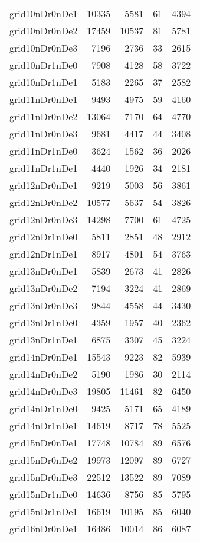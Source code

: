 \begin{longtable}{lrrrr}
grid10nDr0nDe1 & 10335 & 5581 & 61 & 4394 \\
grid10nDr0nDe2 & 17459 & 10537 & 81 & 5781 \\
grid10nDr0nDe3 & 7196 & 2736 & 33 & 2615 \\
grid10nDr1nDe0 & 7908 & 4128 & 58 & 3722 \\
grid10nDr1nDe1 & 5183 & 2265 & 37 & 2582 \\
grid11nDr0nDe1 & 9493 & 4975 & 59 & 4160 \\
grid11nDr0nDe2 & 13064 & 7170 & 64 & 4770 \\
grid11nDr0nDe3 & 9681 & 4417 & 44 & 3408 \\
grid11nDr1nDe0 & 3624 & 1562 & 36 & 2026 \\
grid11nDr1nDe1 & 4440 & 1926 & 34 & 2181 \\
grid12nDr0nDe1 & 9219 & 5003 & 56 & 3861 \\
grid12nDr0nDe2 & 10577 & 5637 & 54 & 3826 \\
grid12nDr0nDe3 & 14298 & 7700 & 61 & 4725 \\
grid12nDr1nDe0 & 5811 & 2851 & 48 & 2912 \\
grid12nDr1nDe1 & 8917 & 4801 & 54 & 3763 \\
grid13nDr0nDe1 & 5839 & 2673 & 41 & 2826 \\
grid13nDr0nDe2 & 7194 & 3224 & 41 & 2869 \\
grid13nDr0nDe3 & 9844 & 4558 & 44 & 3430 \\
grid13nDr1nDe0 & 4359 & 1957 & 40 & 2362 \\
grid13nDr1nDe1 & 6875 & 3307 & 45 & 3224 \\
grid14nDr0nDe1 & 15543 & 9223 & 82 & 5939 \\
grid14nDr0nDe2 & 5190 & 1986 & 30 & 2114 \\
grid14nDr0nDe3 & 19805 & 11461 & 82 & 6450 \\
grid14nDr1nDe0 & 9425 & 5171 & 65 & 4189 \\
grid14nDr1nDe1 & 14619 & 8717 & 78 & 5525 \\
grid15nDr0nDe1 & 17748 & 10784 & 89 & 6576 \\
grid15nDr0nDe2 & 19973 & 12097 & 89 & 6727 \\
grid15nDr0nDe3 & 22512 & 13522 & 89 & 7089 \\
grid15nDr1nDe0 & 14636 & 8756 & 85 & 5795 \\
grid15nDr1nDe1 & 16619 & 10195 & 85 & 6040 \\
grid16nDr0nDe1 & 16486 & 10014 & 86 & 6087 \\

\end{longtable}
